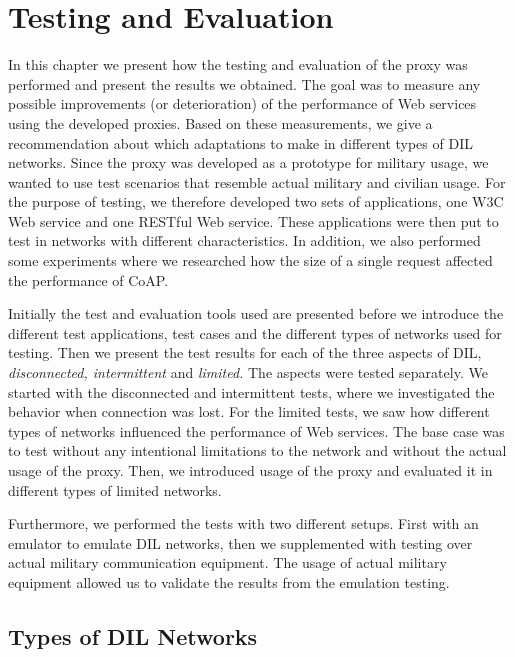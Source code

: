 \chapter{Testing and Evaluation}

\label{chapter:evaluation}

In this chapter we present how the testing and evaluation of the proxy was
performed and present the results we obtained.  The goal was to measure any
possible improvements (or deterioration) of the performance of Web services
using the developed proxies. Based on these measurements, we give a
recommendation about which adaptations to make in different types of DIL
networks. Since the proxy was developed as a prototype for military usage, we
wanted to use test scenarios that resemble actual military and civilian usage.
For the purpose of testing, we therefore developed two sets of applications, one
W3C Web service and one RESTful Web service. These applications were then put to
test in networks with different characteristics. In addition, we also performed
some experiments where we researched how the size of a single request affected
the performance of CoAP.


Initially the test and evaluation tools used are presented before we introduce
the different test applications, test cases and the different types of networks
used for testing. Then we present the test results for each of the three aspects
of DIL, \textit{disconnected, intermittent} and \textit{limited.} The aspects
were tested separately. We started with the disconnected and intermittent tests,
where we investigated the behavior when connection was lost. For the limited
tests, we saw how different types of networks influenced the performance of Web
services. The base case was to test without any intentional limitations to the
network and without the actual usage of the proxy. Then, we introduced usage of
the proxy and evaluated it in different types of limited networks.

Furthermore, we performed the tests with two different setups. First with an
emulator to emulate DIL networks, then we supplemented with testing over
actual military communication equipment. The usage of actual military equipment
allowed us to validate the results from the emulation testing.

\section{Types of DIL Networks}


